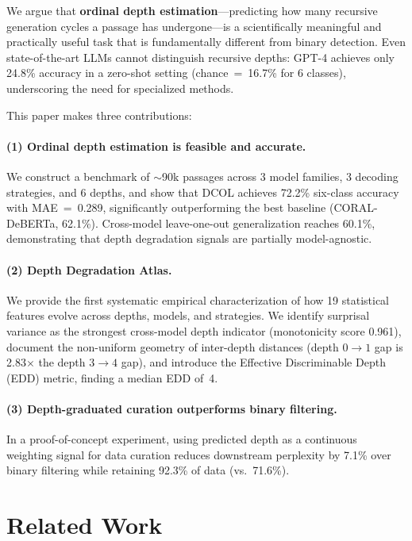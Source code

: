 \documentclass[11pt,a4paper]{article}
\newcommand{\ours}{DCOL}
\newcommand{\atlas}{Atlas}
\begin{document}
We argue that \textbf{ordinal depth estimation}---predicting how many recursive generation cycles a passage has undergone---is a scientifically meaningful and practically useful task that is fundamentally different from binary detection.
Even state-of-the-art LLMs cannot distinguish recursive depths: GPT-4 achieves only 24.8\% accuracy in a zero-shot setting (chance~=~16.7\% for 6 classes), underscoring the need for specialized methods.

This paper makes three contributions:

\paragraph{(1) Ordinal depth estimation is feasible and accurate.}
We construct a benchmark of ${\sim}$90k passages across 3 model families, 3 decoding strategies, and 6 depths, and show that \ours{} achieves 72.2\% six-class accuracy with MAE~=~0.289, significantly outperforming the best baseline (CORAL-DeBERTa, 62.1\%).
Cross-model leave-one-out generalization reaches 60.1\%, demonstrating that depth degradation signals are partially model-agnostic.

\paragraph{(2) Depth Degradation \atlas{}.}
We provide the first systematic empirical characterization of how 19 statistical features evolve across depths, models, and strategies.
We identify surprisal variance as the strongest cross-model depth indicator (monotonicity score 0.961), document the non-uniform geometry of inter-depth distances (depth $0{\to}1$ gap is 2.83$\times$ the depth $3{\to}4$ gap), and introduce the Effective Discriminable Depth (EDD) metric, finding a median EDD of~4.

\paragraph{(3) Depth-graduated curation outperforms binary filtering.}
In a proof-of-concept experiment, using predicted depth as a continuous weighting signal for data curation reduces downstream perplexity by 7.1\% over binary filtering while retaining 92.3\% of data (vs.\ 71.6\%).

\section{Related Work}
\label{sec:related}
\end{document}
